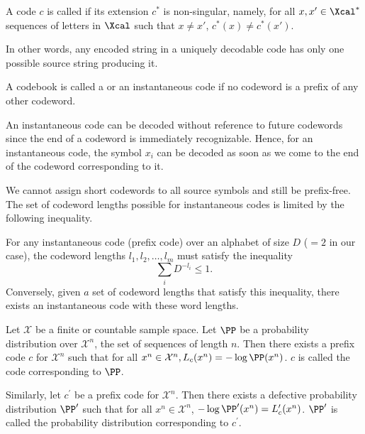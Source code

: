 \begin{definition}
    A code $c$ is called  if its extension $c^*$ is non-singular, namely, for all $x,x'\in \Xcal^*$ sequences of letters in $\Xcal$ such that $x\neq x'$, $c^*(x)\neq c^*(x')$.
\end{definition}
In other words, any encoded string in a uniquely decodable code has only one possible source string producing it.
\begin{definition}
    A codebook is called a  or an instantaneous code if no codeword is a prefix of any other codeword.
\end{definition}
An instantaneous code can be decoded without reference to future codewords since the end of a codeword is immediately recognizable. Hence, for an instantaneous code, the symbol $x_i$ can be decoded as soon as we come to the end of the codeword corresponding to it.

We cannot assign short codewords to all source symbols and still be prefix-free. The set of codeword lengths possible for instantaneous codes is limited by the following inequality.

\begin{lemma}\label{lem:kraft}
    For any instantaneous code (prefix code) over an alphabet of size $D$ ($=2$ in our case), the codeword lengths $l_1, l_2, \ldots, l_m$ must satisfy the inequality
    $$\sum_iD^{-l_i}\leq1.$$
    Conversely, given $a$ set of codeword lengths that satisfy this inequality, there exists an instantaneous code with these word lengths.
\end{lemma}
\begin{corollary}\label{cor:correpondance_proba_code}\cite[p. 96]{grunwald2007minimum}
    Let $\mathcal{X}$ be a finite or countable sample space. Let $\PP$ be a probability distribution over $\mathcal{X}^n$, the set of sequences of length $n.$ Then there exists a prefix code $c$ for $\mathcal{X}^n$ such that for all $x^n\in\mathcal{X}^n,L_c(x^n)=-\log \PP(x^n)$. $c$ is called the code corresponding to $\PP$.
    
    Similarly, let $c^\prime$ be a prefix code for $\mathcal{X}^n.$ Then there exists a defective probability distribution $\PP^\prime$ such that for all $x^n\in\mathcal{X}^n$, $-\log \PP^{\prime}(x^n)=L_c^{\prime}(x^n)$. $\PP^{\prime}$ is called the probability distribution corresponding to $c^\prime$.
\end{corollary}

